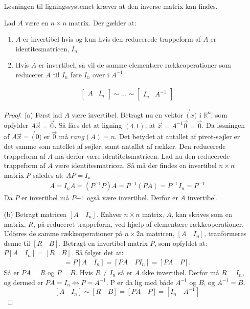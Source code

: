 Løsningen til ligningssystemet kræver at den inverse matrix kan findes. 
\begin{stn}
Lad $A$ være en $n \times n$ matrix. Der gælder at: 
\begin{enumerate}[label=(\alph*)]
\item $A$ er invertibel hvis og kun hvis den reducerede trappeform af $A$ er identitesmatricen, $I_n$
\item Hvis $A$ er invertibel, så vil de samme elementære rækkeoperationer som reducerer $A$ til $I_n$ føre $I_n$ over i $A^{-1}$.  
\end{enumerate}
\begin{align*}
\begin{bmatrix}
A & I_n
\end{bmatrix} \sim \dots \sim
\begin{bmatrix}
I_n & A^{-1}
\end{bmatrix}
\end{align*}
\label{stn:inversmatrix}
\end{stn}

\begin{proof}
(a) Først lad $A$ være invertibel. Betragt nu en vektor $\vec(x)$ i $\mathds{R}^n$, som opfylder $A\vec{x}=\vec{0}$. Så fåes det at ligning $(4.1)$, at $\vec{x}=A^{-1} \vec{0}=\vec{0}$. Da løsningen af  $A\vec{x}=\vec(0)$ er $\vec{0}$ må $rang(A)=n$. Det betydet at antallet af pivot-søjler er det samme som antellet af søjler, samt antallet af rækker. Den reducerede trappeform af $A$ må derfor være identitetsmatricen. 
Lad nu den reducerede trappeform af $A$ være identitesmatricen. Så må der findes en invertibel $n \times n$ matrix $P$ således at: $AP=I_n$
\begin{align*}
A=I_nA=(P^{-1}P)A=P^{-1}(PA)=P^{-1}I_n=P^{-1}
\end{align*}
Da $P$ er invertibel må $P{-1}$ også være invertibel. Derfor er $A$ invertibel. 

(b) Betragt matricen $[A \quad I_n]$. Enhver $n \times n$ matrix, $A$, kan skrives som en matrix, $R$, på reduceret trappeform, ved hjælp af elementære rækkeoperationer. Udføres de samme rækkeoperationer på $n \times 2n$ matricen, $[A \quad I_n]$, tranformeres denne til $[R \quad B]$. Betragt en invertibel matrix $P$, som opfyldet at: $P[A \quad I_n]=[R \quad B]$. Så følger det at:  
\begin{align*}
[R \quad B]=P[A \quad I_n]=[PA \quad PI_n]=[PA \quad P]. 
\end{align*}
Så er $PA=R$ og $P=B$. Hvis $R \neq I_n$ så er $A$ ikke invertibel. Derfor må $R=I_n$, og dermed er $PA=I_n\Leftrightarrow P=A^{-1}$. P er da lig med både $A^{-1}$ og $B$, og $A^{-1}=B$. 
$$[A \quad I_n]\sim[R \quad B]=[PA \quad P]=[I_n \quad A^{-1}]$$
\end{proof}

